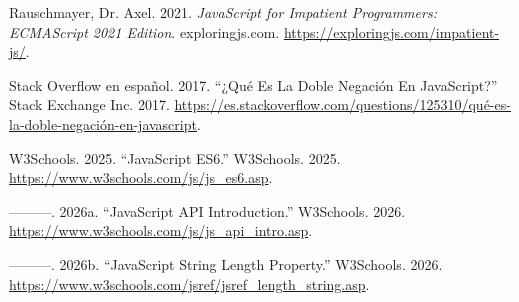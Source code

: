 \documentclass[
  letterpaper,
  DIV=11,
  numbers=noendperiod]{scrreprt}
\newlength{\cslhangindent}
\newenvironment{CSLReferences}[2] %
 {\begin{list}{}{%
  \setlength{\itemindent}{0pt}
  \setlength{\leftmargin}{0pt}
  \setlength{\parsep}{0pt}
  \ifodd #1
   \setlength{\leftmargin}{\cslhangindent}
   \setlength{\itemindent}{-1\cslhangindent}
  \fi
  \setlength{\itemsep}{#2\baselineskip}}}
 {\end{list}}
\begin{document}
\begin{CSLReferences}{1}{0}
Rauschmayer, Dr. Axel. 2021. \emph{JavaScript for Impatient Programmers:
ECMAScript 2021 Edition}. exploringjs.com.
\url{https://exploringjs.com/impatient-js/}.

Stack Overflow en español. 2017. {``¿Qué Es La Doble Negación En
JavaScript?''} Stack Exchange Inc. 2017.
\url{https://es.stackoverflow.com/questions/125310/qué-es-la-doble-negación-en-javascript}.

W3Schools. 2025. {``JavaScript ES6.''} W3Schools. 2025.
\url{https://www.w3schools.com/js/js_es6.asp}.

---------. 2026a. {``JavaScript API Introduction.''} W3Schools. 2026.
\url{https://www.w3schools.com/js/js_api_intro.asp}.

---------. 2026b. {``JavaScript String Length Property.''} W3Schools.
2026. \url{https://www.w3schools.com/jsref/jsref_length_string.asp}.

\end{CSLReferences}
\end{document}
